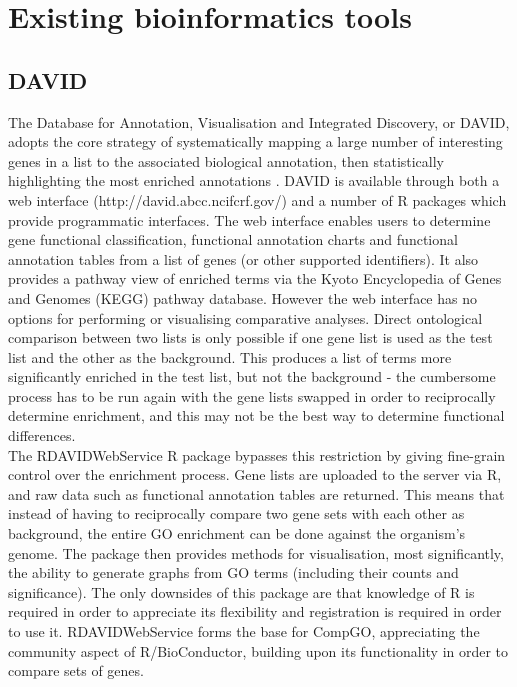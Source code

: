 \documentclass[11pt, oneside]{article}
\begin{document}
\section*{Existing bioinformatics tools}
\subsection*{DAVID}

The Database for Annotation, Visualisation and Integrated Discovery, or DAVID, adopts the core strategy of systematically mapping a large number of interesting genes in a list to the associated biological annotation, then statistically highlighting the most enriched annotations \cite{David08}. %
DAVID is available through both a web interface (http://david.abcc.ncifcrf.gov/) and a number of R packages which provide programmatic interfaces. The web interface enables users to determine gene functional classification, functional annotation charts and functional annotation tables from a list of genes (or other supported identifiers). It also provides a pathway view of enriched terms via the Kyoto Encyclopedia of Genes and Genomes (KEGG) pathway database. However the web interface has no options for performing or visualising comparative analyses. Direct ontological comparison between two lists is only possible if one gene list is used as the test list and the other as the background. This produces a list of terms more significantly enriched in the test list, but not the background -  the cumbersome process has to be run again with the gene lists swapped in order to reciprocally determine enrichment, and this may not be the best way to determine functional differences.\\

The RDAVIDWebService R package bypasses this restriction by giving fine-grain control over the enrichment process. Gene lists are uploaded to the server via R, and raw data such as functional annotation tables are returned. This means that instead of having to reciprocally compare two gene sets with each other as background, the entire GO enrichment can be done against the organism's genome. The package then provides methods for visualisation, most significantly, the ability to generate graphs from GO terms (including their counts and significance). The only downsides of this package are that knowledge of R is required in order to appreciate its flexibility and registration is required in order to use it. RDAVIDWebService forms the base for CompGO, appreciating the community aspect of R/BioConductor, building upon its functionality in order to compare sets of genes.
\end{document}
